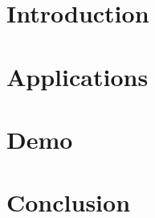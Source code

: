 \section[Intro]{Introduction}


\section[Apps]{Applications}

% 

\section[Demo]{Demo}


\section[Concl]{Conclusion}
